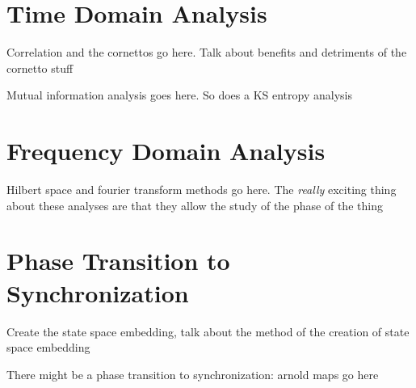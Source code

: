 \documentclass[12pt]{article}
\begin{document}

\section{Time Domain Analysis}
Correlation and the cornettos go here. Talk about benefits and detriments of the cornetto stuff

Mutual information analysis goes here. So does a KS entropy analysis

\section{Frequency Domain Analysis}
Hilbert space and fourier transform methods go here. The \emph{really} exciting thing about these analyses are that they allow the study of the phase of the thing

\section{Phase Transition to Synchronization}

Create the state space embedding, talk about the method of the creation of state space embedding

There might be a phase transition to synchronization: arnold maps go here

%
%
%
%
%
%
%
\end{document}

